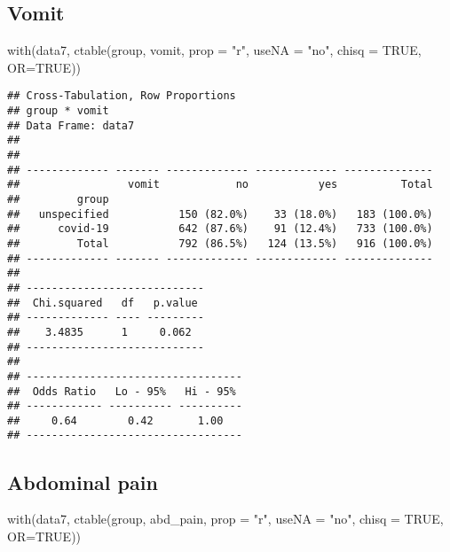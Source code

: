 \documentclass[
]{article}
\newenvironment{Shaded}{\begin{snugshade}}{\end{snugshade}}
\newcommand{\AttributeTok}[1]{\textcolor[rgb]{0.77,0.63,0.00}{#1}}
\newcommand{\ConstantTok}[1]{\textcolor[rgb]{0.00,0.00,0.00}{#1}}
\newcommand{\FunctionTok}[1]{\textcolor[rgb]{0.00,0.00,0.00}{#1}}
\newcommand{\NormalTok}[1]{#1}
\newcommand{\StringTok}[1]{\textcolor[rgb]{0.31,0.60,0.02}{#1}}
\begin{document}
\hypertarget{vomit}{%
\subsection{Vomit}\label{vomit}}

\begin{Shaded}
\begin{Highlighting}[]
\FunctionTok{with}\NormalTok{(data7, }\FunctionTok{ctable}\NormalTok{(group, vomit, }\AttributeTok{prop =} \StringTok{"r"}\NormalTok{, }\AttributeTok{useNA =} \StringTok{"no"}\NormalTok{, }\AttributeTok{chisq =} \ConstantTok{TRUE}\NormalTok{, }\AttributeTok{OR=}\ConstantTok{TRUE}\NormalTok{))}
\end{Highlighting}
\end{Shaded}

\begin{verbatim}
## Cross-Tabulation, Row Proportions  
## group * vomit  
## Data Frame: data7  
## 
## 
## ------------- ------- ------------- ------------- --------------
##                 vomit            no           yes          Total
##         group                                                   
##   unspecified           150 (82.0%)    33 (18.0%)   183 (100.0%)
##      covid-19           642 (87.6%)    91 (12.4%)   733 (100.0%)
##         Total           792 (86.5%)   124 (13.5%)   916 (100.0%)
## ------------- ------- ------------- ------------- --------------
## 
## ----------------------------
##  Chi.squared   df   p.value 
## ------------- ---- ---------
##    3.4835      1     0.062  
## ----------------------------
## 
## ----------------------------------
##  Odds Ratio   Lo - 95%   Hi - 95% 
## ------------ ---------- ----------
##     0.64        0.42       1.00   
## ----------------------------------
\end{verbatim}

\hypertarget{abdominal-pain}{%
\subsection{Abdominal pain}\label{abdominal-pain}}

\begin{Shaded}
\begin{Highlighting}[]
\FunctionTok{with}\NormalTok{(data7, }\FunctionTok{ctable}\NormalTok{(group, abd\_pain, }\AttributeTok{prop =} \StringTok{"r"}\NormalTok{, }\AttributeTok{useNA =} \StringTok{"no"}\NormalTok{, }\AttributeTok{chisq =} \ConstantTok{TRUE}\NormalTok{, }\AttributeTok{OR=}\ConstantTok{TRUE}\NormalTok{))}
\end{Highlighting}
\end{Shaded}
\end{document}
